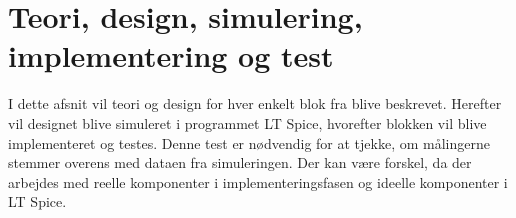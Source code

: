 \section{Teori, design, simulering, implementering og test }
I dette afsnit vil teori og design for hver enkelt blok fra  blive beskrevet. Herefter vil designet blive simuleret i programmet LT Spice, hvorefter blokken vil blive implementeret og testes. Denne test er nødvendig for at tjekke, om målingerne stemmer overens med dataen fra simuleringen. Der kan være forskel, da der arbejdes med reelle komponenter i implementeringsfasen og ideelle komponenter i LT Spice.